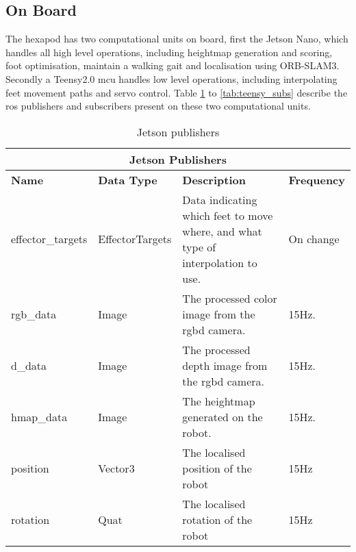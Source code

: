     \subsection{On Board} \label{sec:on_board_ros}
        The hexapod has two computational units on board, first the Jetson Nano, which handles all high level operations, including heightmap generation and scoring,
        foot optimisation, maintain a walking gait and localisation using ORB-SLAM3. Secondly a Teensy2.0 \ac{mcu} handles low level operations, including interpolating feet movement paths
        and servo control. Table \ref{tab:jetson_pubs} to \ref{tab:teensy_subs} describe the \ac{ros} publishers and subscribers present on these two computational units.
        \begin{table}[h]
            \centering
            \begin{tabularx}{\textwidth}{| l | l | X | l |}
                \hline
                \multicolumn{4}{|c|}{\textbf{Jetson Publishers}} \\ \hline
                \textbf{Name} & \textbf{Data Type} & \textbf{Description} & \textbf{Frequency} \\ \hline
                effector\_targets & EffectorTargets & Data indicating which feet to move where, and what type of interpolation to use. & On change\\ \hline
                rgb\_data & Image & The processed color image from the \ac{rgbd} camera. & 15Hz. \\ \hline
                d\_data & Image & The processed depth image from the \ac{rgbd} camera. & 15Hz. \\ \hline
                hmap\_data & Image & The heightmap generated on the robot. & 15Hz. \\ \hline
                position & Vector3 & The localised position of the robot & 15Hz \\ \hline
                rotation & Quat & The localised rotation of the robot & 15Hz \\ \hline
            \end{tabularx}
            \caption{Jetson publishers}
            \label{tab:jetson_pubs}
        \end{table}


